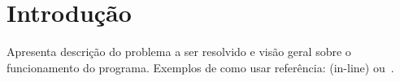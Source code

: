 \chapter{Introdução}
\label{sec-intro}


Apresenta descrição do problema a ser resolvido e visão geral sobre o funcionamento do programa.
Exemplos de como usar referência:  (in-line) ou~\cite{guarino-et-al:hobook09}.
